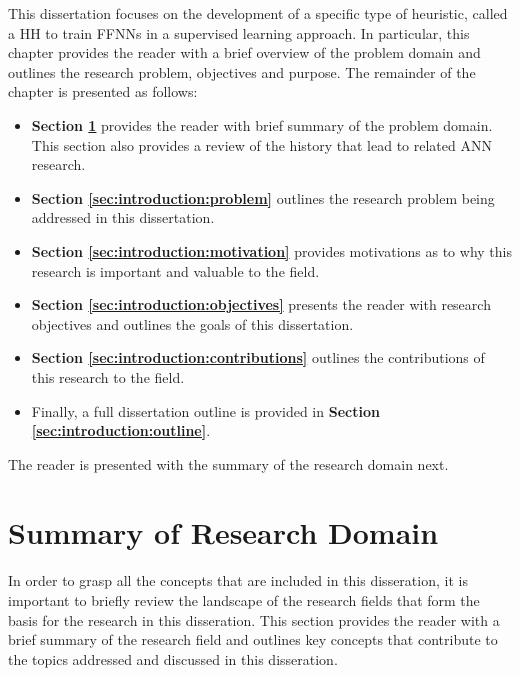 This dissertation focuses on the development of a specific type of heuristic, called a \acl{HH} to train \acp{FFNN} in a supervised learning approach. In particular, this chapter provides the reader with a brief overview of the problem domain and outlines the research problem, objectives and purpose. The remainder of the chapter is presented as follows:

\begin{itemize}
      \item \textbf{Section \ref{sec:introduction:summary_research_domain}} provides the reader with brief summary of the problem domain. This section also provides a review of the history that lead to related \ac{ANN} research.

      \item \textbf{Section \ref{sec:introduction:problem}} outlines the research problem being addressed in this dissertation.

      \item \textbf{Section \ref{sec:introduction:motivation}} provides motivations as to why this research is important and valuable to the field.

      \item \textbf{Section \ref{sec:introduction:objectives}} presents the reader with research objectives and outlines the goals of this dissertation.

      \item \textbf{Section \ref{sec:introduction:contributions}} outlines the contributions of this research to the field.

      \item Finally, a full dissertation outline is provided in \textbf{Section \ref{sec:introduction:outline}}.
\end{itemize}

The reader is presented with the summary of the research domain next.

\section{Summary of Research Domain}\label{sec:introduction:summary_research_domain}

In order to grasp all the concepts that are included in this disseration, it is important to briefly review the landscape of the research fields that form the basis for the research in this disseration. This section provides the reader with a brief summary of the research field and outlines key concepts that contribute to the topics addressed and discussed in this disseration.

